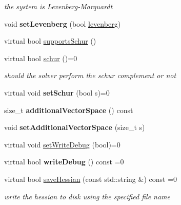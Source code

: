 \begin{DoxyCompactItemize}
\begin{DoxyCompactList}\small\item\em the system is Levenberg-\/\-Marquardt \end{DoxyCompactList}\item 
\hypertarget{classg2o_1_1Solver_a01e21c08d7ec8c8051de565b5c314fa1}{void {\bfseries set\-Levenberg} (bool \hyperlink{classg2o_1_1Solver_a074069dacd2ac34c895c6f2f333e38d5}{levenberg})}\label{classg2o_1_1Solver_a01e21c08d7ec8c8051de565b5c314fa1}

\item 
virtual bool \hyperlink{classg2o_1_1Solver_a36c68f7bc0b8864ee7722bc3c06de554}{supports\-Schur} ()
\item 
\hypertarget{classg2o_1_1Solver_acc8d6a8ae7847a157d4a2f44aea14c74}{virtual bool \hyperlink{classg2o_1_1Solver_acc8d6a8ae7847a157d4a2f44aea14c74}{schur} ()=0}\label{classg2o_1_1Solver_acc8d6a8ae7847a157d4a2f44aea14c74}

\begin{DoxyCompactList}\small\item\em should the solver perform the schur complement or not \end{DoxyCompactList}\item 
\hypertarget{classg2o_1_1Solver_a30134c828054375b1cc16ede2a879761}{virtual void {\bfseries set\-Schur} (bool s)=0}\label{classg2o_1_1Solver_a30134c828054375b1cc16ede2a879761}

\item 
\hypertarget{classg2o_1_1Solver_aeee599d4f7fbeba89c02569174c0c099}{size\-\_\-t {\bfseries additional\-Vector\-Space} () const }\label{classg2o_1_1Solver_aeee599d4f7fbeba89c02569174c0c099}

\item 
\hypertarget{classg2o_1_1Solver_ad35b33cee11586c8adea12cd6949f74a}{void {\bfseries set\-Additional\-Vector\-Space} (size\-\_\-t s)}\label{classg2o_1_1Solver_ad35b33cee11586c8adea12cd6949f74a}

\item 
virtual void \hyperlink{classg2o_1_1Solver_ad3ef2a487d991363ba86af2840b0d7cd}{set\-Write\-Debug} (bool)=0
\item 
\hypertarget{classg2o_1_1Solver_a0f6f14940eccea0f9bf9e2ea144c9b4d}{virtual bool {\bfseries write\-Debug} () const =0}\label{classg2o_1_1Solver_a0f6f14940eccea0f9bf9e2ea144c9b4d}

\item 
\hypertarget{classg2o_1_1Solver_a14852543c4dc3f3e7088efe03aa135eb}{virtual bool \hyperlink{classg2o_1_1Solver_a14852543c4dc3f3e7088efe03aa135eb}{save\-Hessian} (const std\-::string \&) const =0}\label{classg2o_1_1Solver_a14852543c4dc3f3e7088efe03aa135eb}

\begin{DoxyCompactList}\small\item\em write the hessian to disk using the specified file name \end{DoxyCompactList}\end{DoxyCompactItemize}

